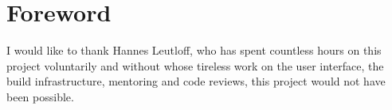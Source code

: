 \documentclass[a4paper,11pt]{article}
\begin{document}
    
    \maketitle

    \pagebreak

    

    \pagebreak
    
    \tableofcontents

    \pagebreak
    
    \section{Foreword}
        I would like to thank Hannes Leutloff, who has spent countless hours
        on this project voluntarily and without whose tireless work on
        the user interface, the build infrastructure, mentoring and code reviews, 
        this project would not have been possible.

    
    
    
    
    
    

    \pagebreak

    

    \pagebreak
    
    \listoffigures
    \listoftables
    
    
    
    
\end{document}
